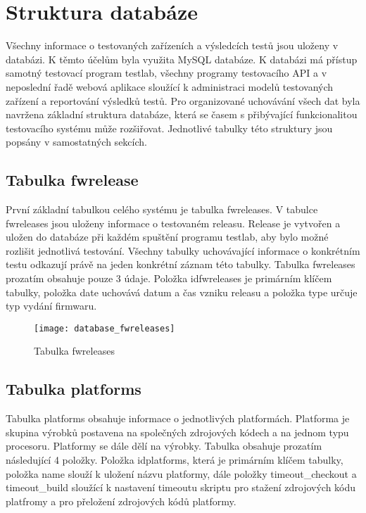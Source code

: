 \section{Struktura databáze}
Všechny informace o testovaných zařízeních a výsledcích testů jsou uloženy v databázi. K těmto účelům byla využita MySQL databáze. K databázi má přístup samotný testovací program testlab, všechny programy testovacího API a v neposlední řadě webová aplikace sloužící k administraci modelů testovaných zařízení a reportování výsledků testů. Pro organizované uchovávání všech dat byla navržena základní struktura databáze, která se časem s přibývající funkcionalitou testovacího systému může rozšiřovat. Jednotlivé tabulky této struktury jsou popsány v samostatných sekcích.

\subsection{Tabulka fwrelease}
První základní tabulkou celého systému je tabulka fwreleases. V tabulce fwreleases jsou uloženy informace o testovaném releasu. Release je vytvořen a uložen do databáze při každém spuštění programu testlab, aby bylo možné rozlišit jednotlivá testování. Všechny tabulky uchovávající informace o konkrétním testu odkazují právě na jeden konkrétní záznam této tabulky. Tabulka fwreleases prozatím obsahuje pouze 3 údaje. Položka idfwreleases je primárním klíčem tabulky, položka date uchovává datum a čas vzniku releasu a položka type určuje typ vydání firmwaru.

\begin{figure}[h]
  \centering
  \texttt{[image: database\_fwreleases]}
  \caption{Tabulka fwreleases}
  \label{fig:database_fwreleases}
\end{figure}

\subsection{Tabulka platforms}
Tabulka platforms obsahuje informace o jednotlivých platformách. Platforma je skupina výrobků postavena na společných zdrojových kódech a na jednom typu procesoru. Platformy se dále dělí na výrobky. Tabulka obsahuje prozatím následující 4 položky. Položka idplatforms, která je primárním klíčem tabulky, položka name slouží k uložení názvu platformy, dále položky timeout\_checkout a timeout\_build sloužící k nastavení timeoutu skriptu pro stažení zdrojových kódu platfromy a pro přeložení zdrojových kódů platformy.


